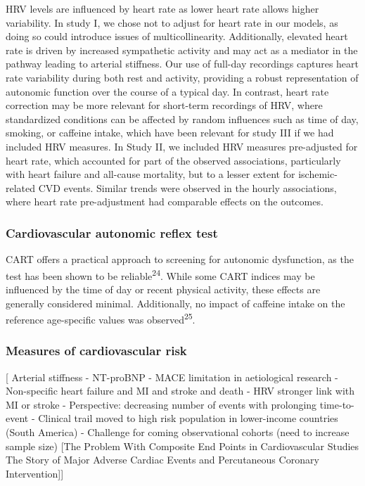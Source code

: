 \documentclass[
  a4paper,
  headsepline=true,
  open=any]{scrbook}
\begin{document}
HRV levels are influenced by heart rate as lower heart rate allows
higher variability. In study I, we chose not to adjust for heart rate in
our models, as doing so could introduce issues of multicollinearity.
Additionally, elevated heart rate is driven by increased sympathetic
activity and may act as a mediator in the pathway leading to arterial
stiffness. Our use of full-day recordings captures heart rate
variability during both rest and activity, providing a robust
representation of autonomic function over the course of a typical day.
In contrast, heart rate correction may be more relevant for short-term
recordings of HRV, where standardized conditions can be affected by
random influences such as time of day, smoking, or caffeine intake,
which have been relevant for study III if we had included HRV measures.
In Study II, we included HRV measures pre-adjusted for heart rate, which
accounted for part of the observed associations, particularly with heart
failure and all-cause mortality, but to a lesser extent for
ischemic-related CVD events. Similar trends were observed in the hourly
associations, where heart rate pre-adjustment had comparable effects on
the outcomes.

\hypertarget{cardiovascular-autonomic-reflex-test}{%
\subsubsection{Cardiovascular autonomic reflex
test}\label{cardiovascular-autonomic-reflex-test}}

CART offers a practical approach to screening for autonomic dysfunction,
as the test has been shown to be reliable\textsuperscript{24}. While
some CART indices may be influenced by the time of day or recent
physical activity, these effects are generally considered minimal.
Additionally, no impact of caffeine intake on the reference age-specific
values was observed\textsuperscript{25}.

\hypertarget{measures-of-cardiovascular-risk}{%
\subsubsection{Measures of cardiovascular
risk}\label{measures-of-cardiovascular-risk}}

{[} Arterial stiffness - NT-proBNP - MACE limitation in aetiological
research - Non-specific heart failure and MI and stroke and death - HRV
stronger link with MI or stroke - Perspective: decreasing number of
events with prolonging time-to-event - Clinical trail moved to high risk
population in lower-income countries (South America) - Challenge for
coming observational cohorts (need to increase sample size) {[}The
Problem With Composite End Points in Cardiovascular Studies The Story of
Major Adverse Cardiac Events and Percutaneous Coronary
Intervention{]}{]}
\end{document}
